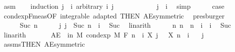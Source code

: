 \begin{isabellebody}
\ asm\isanewline
\ \ \isamarkupfalse%
\ {\isacharparenleft}{\kern0pt}induction\ {\isachardoublequoteopen}j\ {\isacharminus}{\kern0pt}\ i{\isachardoublequoteclose}\ arbitrary{\isacharcolon}{\kern0pt}\ i\ j{\isacharparenright}{\kern0pt}\isanewline
\ \ \ \ \isamarkupfalse%
\ {}\isanewline
\ \ \ \ \isamarkupfalse%
\ {\isachardoublequoteopen}j\ {\isacharequal}{\kern0pt}\ i{\isachardoublequoteclose}\ \isamarkupfalse%
\ simp\isanewline
\ \ \ \ \isamarkupfalse%
\ {\isacharquery}{\kern0pt}case\ \isamarkupfalse%
\ cond{\isacharunderscore}{\kern0pt}exp{\isacharunderscore}{\kern0pt}F{\isacharunderscore}{\kern0pt}meas{\isacharbrackleft}{\kern0pt}OF\ integrable\ adapted{\isacharcomma}{\kern0pt}\ THEN\ AE{\isacharunderscore}{\kern0pt}symmetric{\isacharbrackright}{\kern0pt}\ \isamarkupfalse%
\ presburger\isanewline
\ \ \isamarkupfalse%
\isanewline
\ \ \ \ \isamarkupfalse%
\ {\isacharparenleft}{\kern0pt}Suc\ n{\isacharparenright}{\kern0pt}\isanewline
\ \ \ \ \isamarkupfalse%
\ j{\isacharcolon}{\kern0pt}\ {\isachardoublequoteopen}j\ {\isacharequal}{\kern0pt}\ Suc\ {\isacharparenleft}{\kern0pt}n\ {\isacharplus}{\kern0pt}\ i{\isacharparenright}{\kern0pt}{\isachardoublequoteclose}\ \isamarkupfalse%
\ Suc\ \isamarkupfalse%
\ linarith\isanewline
\ \ \ \ \isamarkupfalse%
\ n{\isacharcolon}{\kern0pt}\ {\isachardoublequoteopen}n\ {\isacharequal}{\kern0pt}\ n\ {\isacharplus}{\kern0pt}\ i\ {\isacharminus}{\kern0pt}\ i{\isachardoublequoteclose}\ \isamarkupfalse%
\ Suc\ \isamarkupfalse%
\ linarith\isanewline
\ \ \ \ \isamarkupfalse%
\ {\isacharasterisk}{\kern0pt}{\isacharcolon}{\kern0pt}\ {\isachardoublequoteopen}AE\ {\isasymxi}\ in\ M{\isachardot}{\kern0pt}\ cond{\isacharunderscore}{\kern0pt}exp\ M\ {\isacharparenleft}{\kern0pt}F\ {\isacharparenleft}{\kern0pt}n\ {\isacharplus}{\kern0pt}\ i{\isacharparenright}{\kern0pt}{\isacharparenright}{\kern0pt}\ {\isacharparenleft}{\kern0pt}X\ j{\isacharparenright}{\kern0pt}\ {\isasymxi}\ {\isacharequal}{\kern0pt}\ X\ {\isacharparenleft}{\kern0pt}n\ {\isacharplus}{\kern0pt}\ i{\isacharparenright}{\kern0pt}\ {\isasymxi}{\isachardoublequoteclose}\ \isamarkupfalse%
\ j\ \isamarkupfalse%
\ assms{\isacharparenleft}{\kern0pt}{}{\isacharparenright}{\kern0pt}{\isacharbrackleft}{\kern0pt}THEN\ AE{\isacharunderscore}{\kern0pt}symmetric{\isacharbrackright}{\kern0pt}\ \isamarkupfalse%

\end{isabellebody}
